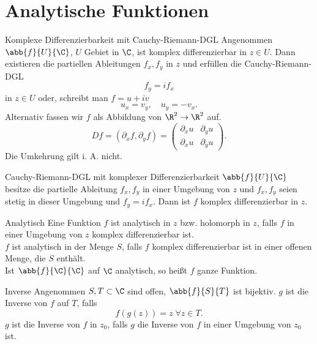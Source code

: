 \section{Analytische Funktionen}

\begin{karte}{Komplexe Differenzierbarkeit mit Cauchy-Riemann-DGL}
    Angenommen \(\abb{f}{U}{\C}\), \(U\) Gebiet in \(\C\), ist komplex 
    differenzierbar in \(z\in U\). Dann existieren die partiellen Ableitungen 
    \(f_x, f_y\) in \(z\) und erfüllen die Cauchy-Riemann-DGL 
    \[ f_y = i f_x \]
    in \(z\in U\) oder, schreibt man \(f=u+iv\) 
    \[ u_x = v_y, \quad u_y = -v_x. \]
    Alternativ fassen wir \(f\) als Abbildung von \(\R^2 \rightarrow \R^2\) auf. 
    \[ Df = (\partial_x f, \partial_y f) = \begin{pmatrix}
        \partial_x u & \partial_y u \\ \partial_x u & \partial_y u
    \end{pmatrix}. \]
    Die Umkehrung gilt i. A. nicht.
\end{karte}

\begin{karte}{Cauchy-Riemann-DGL mit komplexer Differenzierbarkeit}
    \( \abb{f}{U}{\C} \) besitze die partielle Ableitung \(f_x, f_y\) in einer Umgebung von \(z\) 
    und \(f_x, f_y\) seien stetig in dieser Umgebung und \(f_y = i f_x\). Dann ist \(f\) komplex 
    differenzierbar in \(z\).
\end{karte}

\begin{karte}{Analytisch}
    Eine Funktion \(f\) ist analytisch in \(z\) bzw. holomorph in \(z\), 
    falls \(f\) in einer Umgebung von \(z\) komplex differenzierbar ist.\\
    \(f\) ist analytisch in der Menge \(S\), falls \(f\) komplex differenzierbar 
    ist in einer offenen Menge, die \(S\) enthält. \\
    Ist \(\abb{f}{\C}{\C}\) auf \(\C\) analytisch, so heißt \(f\) ganze Funktion.
\end{karte}

\begin{karte}{Inverse}
    Angenommen \(S, T \subset \C\) sind offen, \(\abb{f}{S}{T}\) ist bijektiv. 
    \(g\) ist die Inverse von \(f\) auf \(T\), falls 
    \[ f(g(z)) = z \;\forall z\in T. \]
    \(g\) ist die Inverse von \(f\) in \(z_0\), falls \(g\) die Inverse von \(f\) 
    in einer Umgebung von \(z_0\) ist.
\end{karte}

